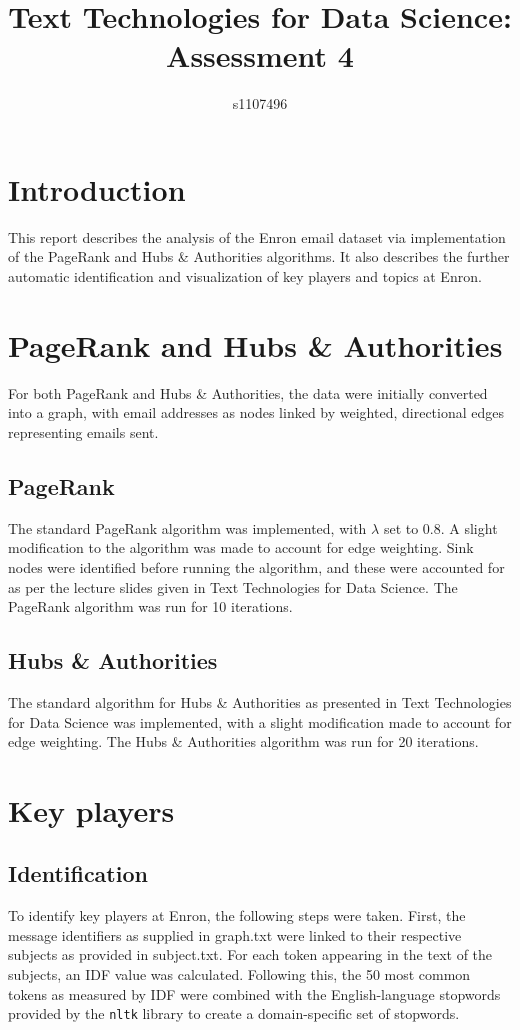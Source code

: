 \documentclass{article}
\begin{document}
\title{Text Technologies for Data Science: Assessment 4}
\author{s1107496}

\maketitle

\section{Introduction}
This report describes the analysis of the Enron email dataset via implementation of the PageRank and Hubs \& Authorities algorithms. It also describes the further automatic identification and visualization of key players and topics at Enron.

\section{PageRank and Hubs \& Authorities}
For both PageRank and Hubs \& Authorities, the data were initially converted into a graph, with email addresses as nodes linked by weighted, directional edges representing emails sent.
\subsection{PageRank}
The standard PageRank algorithm was implemented, with $\lambda$ set to 0.8. A slight modification to the algorithm was made to account for edge weighting. Sink nodes were identified before running the algorithm, and these were accounted for as per the lecture slides given in Text Technologies for Data Science. The PageRank algorithm was run for 10 iterations.
\subsection{Hubs \& Authorities}
The standard algorithm for Hubs \& Authorities as presented in Text Technologies for Data Science was implemented, with a slight modification made to account for edge weighting. The Hubs \& Authorities algorithm was run for 20 iterations.

\section{Key players}
\subsection{Identification}
To identify key players at Enron, the following steps were taken. First, the message identifiers as supplied in graph.txt were linked to their respective subjects as provided in subject.txt. For each token appearing in the text of the subjects, an IDF value was calculated. Following this, the 50 most common tokens as measured by IDF were combined with the English-language stopwords provided by the \texttt{nltk} library to create a domain-specific set of stopwords.
\end{document}
